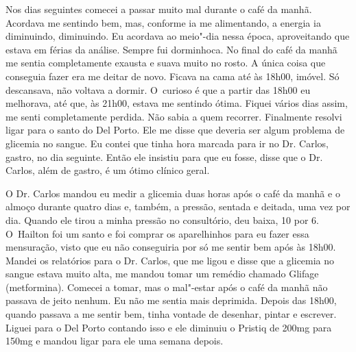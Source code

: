 Nos dias seguintes comecei a passar muito mal durante o café da manhã.
Acordava me sentindo bem, mas, conforme ia me alimentando, a energia ia
diminuindo, diminuindo. Eu acordava ao meio"-dia nessa época,
aproveitando que estava em férias da análise. Sempre fui dorminhoca. No
final do café da manhã me sentia completamente exausta e suava muito no
rosto. A única coisa que conseguia fazer era me deitar de novo. Ficava
na cama até às 18h00, imóvel. Só descansava, não voltava a dormir. O~curioso é que a partir das 18h00 eu melhorava, até que, às 21h00, estava
me sentindo ótima. Fiquei vários dias assim, me senti completamente
perdida. Não sabia a quem recorrer. Finalmente resolvi ligar para o
santo do Del Porto. Ele me disse que deveria ser algum problema de
glicemia no sangue. Eu contei que tinha hora marcada para ir no Dr.
Carlos, gastro, no dia seguinte. Então ele insistiu para que eu fosse,
disse que o Dr. Carlos, além de gastro, é um ótimo clínico geral.

O Dr. Carlos mandou eu medir a glicemia duas horas após o café da manhã
e o almoço durante quatro dias e, também, a pressão, sentada e deitada,
uma vez por dia. Quando ele tirou a minha pressão no consultório, deu
baixa, 10 por 6. O~Hailton foi um santo e foi comprar os aparelhinhos
para eu fazer essa mensuração, visto que eu não conseguiria por só me
sentir bem após às 18h00. Mandei os relatórios para o Dr. Carlos, que me
ligou e disse que a glicemia no sangue estava muito alta, me mandou
tomar um remédio chamado Glifage (metformina). Comecei a tomar, mas o
mal"-estar após o café da manhã não passava de jeito nenhum. Eu não me
sentia mais deprimida. Depois das 18h00, quando passava a me sentir bem,
tinha vontade de desenhar, pintar e escrever. Liguei para o Del Porto
contando isso e ele diminuiu o Pristiq de 200mg para 150mg e mandou
ligar para ele uma semana depois.

